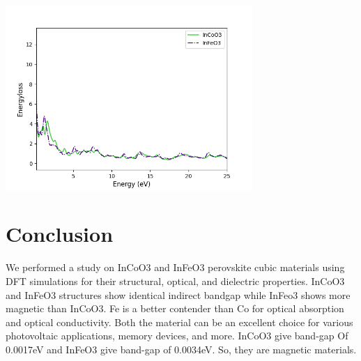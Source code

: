 \documentclass[12pt, letterpaper]{article}
\newcommand*{\1}{\hspace{1pt}}
\begin{document}
    \begin{adjustbox}{center,caption={Energyloss spectrum of InCoO3 and InFeO3},label={somelabel},nofloat=figure,}
        \includegraphics[width=0.7\textwidth]{enloss}
    \end{adjustbox}

    \section{Conclusion}
    We performed a study on  InCoO3 and InFeO3\cite{r2} perovskite cubic materials using  DFT simulations for their structural, optical, and dielectric properties. InCoO3
    and InFeO3 structures show identical indirect bandgap while InFeo3 shows more magnetic than InCoO3. Fe is a better contender than Co for optical absorption 
    and optical conductivity. Both the material can be an excellent choice for various photovoltaic applications, memory devices, and more. InCoO3 give band-gap Of
    0.0017eV and InFeO3 give band-gap of 0.0034eV. So, they are magnetic materials.
    
    
    
    
\end{document}
